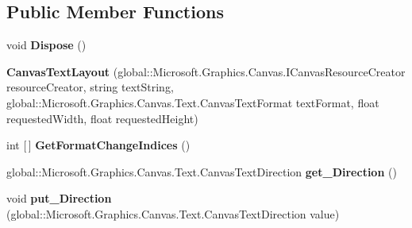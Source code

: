 \subsection*{Public Member Functions}
\begin{DoxyCompactItemize}
\item 
\mbox{\label{class_microsoft_1_1_graphics_1_1_canvas_1_1_text_1_1_canvas_text_layout_a7d35b539c782a63cef76d60d771100b9}} 
void {\bfseries Dispose} ()
\item 
\mbox{\label{class_microsoft_1_1_graphics_1_1_canvas_1_1_text_1_1_canvas_text_layout_a3e6e6ee905c4e104025e259714b4f387}} 
{\bfseries Canvas\+Text\+Layout} (global\+::\+Microsoft.\+Graphics.\+Canvas.\+I\+Canvas\+Resource\+Creator resource\+Creator, string text\+String, global\+::\+Microsoft.\+Graphics.\+Canvas.\+Text.\+Canvas\+Text\+Format text\+Format, float requested\+Width, float requested\+Height)
\item 
\mbox{\label{class_microsoft_1_1_graphics_1_1_canvas_1_1_text_1_1_canvas_text_layout_a3a21e6cfe852ee1c03c9ae0f65349cbe}} 
int \mbox{[}$\,$\mbox{]} {\bfseries Get\+Format\+Change\+Indices} ()
\item 
\mbox{\label{class_microsoft_1_1_graphics_1_1_canvas_1_1_text_1_1_canvas_text_layout_acf787c5c52efb0a761fd5fa779c0b7a6}} 
global\+::\+Microsoft.\+Graphics.\+Canvas.\+Text.\+Canvas\+Text\+Direction {\bfseries get\+\_\+\+Direction} ()
\item 
\mbox{\label{class_microsoft_1_1_graphics_1_1_canvas_1_1_text_1_1_canvas_text_layout_a73aa648a92dd6826fcda1869c17dd35d}} 
void {\bfseries put\+\_\+\+Direction} (global\+::\+Microsoft.\+Graphics.\+Canvas.\+Text.\+Canvas\+Text\+Direction value)
\item 
\mbox{\label{class_microsoft_1_1_graphics_1_1_canvas_1_1_text_1_1_canvas_text_layout_a3b9b032aa706d4c64f518de16b2fb53d}} 

\end{DoxyCompactItemize}
